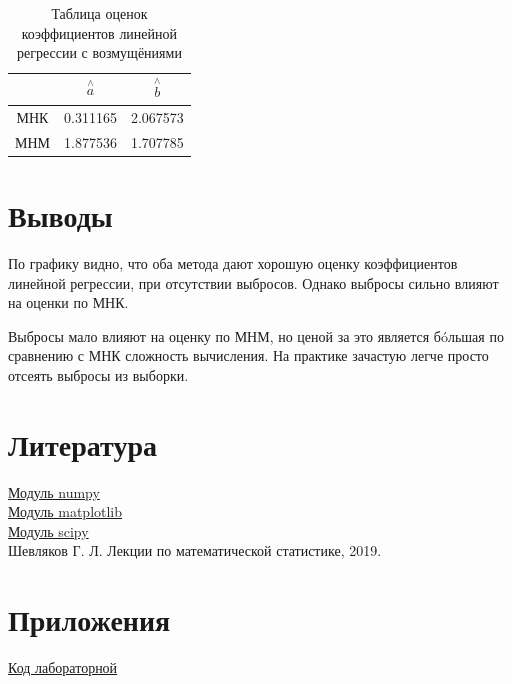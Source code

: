 \documentclass[a4]{article}
\begin{document}
\begin{table}[H]
\caption{Таблица оценок коэффициентов линейной регрессии с возмущёниями}
\label{tab:my_label2}
\begin{center}
\vspace{5mm}
\begin{tabular}{|c|c|c|}
\hline
& $\overset{\wedge}{a}$ & $\overset{\wedge}{b}$\\
\hline
МНК &0.311165&2.067573\\
\hline
МНМ &1.877536 &1.707785\\
\hline
\end{tabular}
\end{center}
\end{table}



\section{Выводы}
По графику видно, что оба метода дают хорошую оценку коэффициентов линейной регрессии, при отсутствии выбросов. Однако выбросы сильно влияют на оценки по МНК.

Выбросы мало влияют на оценку по МНМ, но ценой за это является б\'oльшая по сравнению с МНК сложность вычисления. На практике зачастую легче просто отсеять выбросы из выборки.


\section{Литература}

\href{https://physics.susu.ru/vorontsov/language/numpy.html}{Модуль numpy}\\

\href{https://matplotlib.org/}{Модуль matplotlib}\\

\href{https://www.scipy.org/}{Модуль scipy}\\

Шевляков Г. Л. Лекции по математической статистике, 2019.


\section{Приложения}

\href{https://github.com/dmitry-maltsov/PolyMatStat/blob/master/6/lab6.py}{Код лабораторной}
\end{document}
